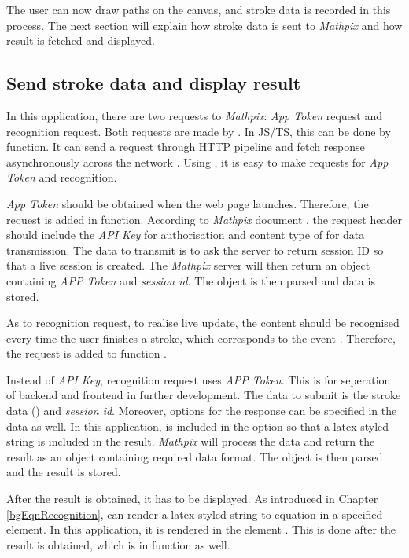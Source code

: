 \documentclass[12pt,twoside]{report}
\begin{document}
The user can now draw paths on the canvas, and stroke data is recorded in this process. The next section will explain how stroke data is sent to \textit{Mathpix} and how result is fetched and displayed.

\subsection{Send stroke data and display result}
In this application, there are two requests to \textit{Mathpix}: \textit{App Token} request and recognition request. Both requests are made by . In JS/TS, this can be done by  function. It can send a request through HTTP pipeline and fetch response asynchronously across the network \cite{web:fetchapi}. Using , it is easy to make requests for \textit{App Token} and recognition.

\textit{App Token} should be obtained when the web page launches. Therefore, the
request is added in  function. According to \textit{Mathpix}
document \cite{web:mathpixdoc}, the request header should include the \textit{API Key} for authorisation and content type of  for data transmission. The data to transmit is to ask the server to return session ID so that a live session is created. The \textit{Mathpix} server will then return an object containing \textit{APP Token} and \textit{session id}. The object is then parsed and data is stored.

As to recognition request, to realise live update, the content should be recognised every time the user finishes a stroke, which corresponds to the event . Therefore, the request is added to function . 

Instead of \textit{API Key}, recognition request uses \textit{APP Token}. This
is for seperation of backend and frontend in further development. The data to
submit is the stroke data () and \textit{session id}. Moreover,
options for the response can be specified in the data as well. In this
application,  is included in the option so that a latex styled string is included in the result. \textit{Mathpix}
will process the data and return the result as an object containing required
data format. The object is then parsed and the  result is stored.

After the result is obtained, it has to be displayed. As introduced in Chapter \ref{bgEqnRecognition},  can render a latex styled string to equation in a specified element. In this application, it is rendered in the element . This is done after the result is obtained, which is in function  as well.
\end{document}
